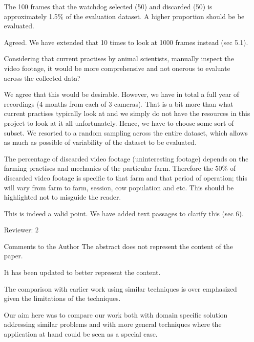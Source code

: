 \documentclass[10pt,a4paper]{letter}
\begin{document}
\begin{letter}{}
\begin{siderules}
The 100 frames that the watchdog selected (50) and discarded (50) is approximately 1.5\% of the evaluation dataset. 
A higher proportion should be be evaluated. 
\end{siderules}

Agreed. We have extended that 10 times to look at 1000 frames instead (sec 5.1).

\begin{siderules}
Considering that current practises by animal scientists, manually inspect the video footage, it would be more 
comprehensive and not onerous to evaluate across the collected data?
\end{siderules}

We agree that this would be desirable. However, we have in total a full year of recordings (4 months from each of 3 cameras). 
That is a bit more than what current practises typically look at and
we simply do not have the resources in this project to look at it all unfortunately. 
Hence, we have to choose some sort of subset. We resorted to a random sampling across the
entire dataset, which allows as much as possible of variability of the dataset to be evaluated.

\begin{siderules}
The percentage of discarded video footage (uninteresting footage) depends on the farming practises and mechanics of the particular farm. Therefore the 50\% of discarded video footage is specific to that farm and that period of operation; this will vary from farm to farm, session, cow population and etc. This should be highlighted not to misguide the reader.
\end{siderules}

This is indeed a valid point. We have added text passages to clarify this (sec 6).

\begin{siderules}
Reviewer: 2

Comments to the Author
The abstract does not represent the content of the paper.
\end{siderules}

It has been updated to better represent the content.

\begin{siderules}
The comparison with earlier work using similar techniques is over emphasized given the limitations
of the techniques.
\end{siderules}

Our aim here was to compare our work both with domain specific solution addressing similar problems and with more general techniques where the application at hand could be seen as a special case.


\end{letter}
\end{document}
